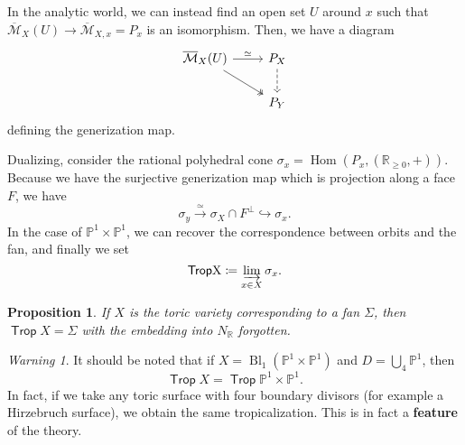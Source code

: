 \documentclass[leqno, openany]{memoir}
\newtheorem{prop}[thm]{Proposition}
\theoremstyle{definition}
\theoremstyle{remark}
\newtheorem{warn}[thm]{Warning}
\theoremstyle{plain}
\theoremstyle{definition}
\theoremstyle{remark}
\newcommand{\R}{\mathbb{R}}
\renewcommand{\P}{\mathbb{P}}
\newcommand{\mc}[1]{\mathcal{#1}}
\newcommand{\ms}[1]{\mathsf{#1}}
\newcommand{\on}[1]{\operatorname{#1}}
\newcommand{\ol}[1]{\overline{#1}}
\DeclareMathOperator{\Bl}{Bl}
\DeclareMathOperator{\Hom}{Hom}
\begin{document}
In the analytic world, we can instead find an open set $U$ around $x$ such that $\ol{\mc{M}}_X(U) \to \ol{\mc{M}}_{X,x} = P_x$ is an isomorphism. Then, we have a diagram
\begin{equation*}
  \begin{tikzcd}
    \ol{\mc{M}}_X(U) \ar{r}{\simeq} \ar[twoheadrightarrow]{dr} & P_X \ar[dashrightarrow]{d} \\
    & P_Y
  \end{tikzcd}
\end{equation*}
defining the generization map.

Dualizing, consider the rational polyhedral cone $\sigma_x = \Hom(P_x, (\R_{\geq 0}, +))$. Because we have the surjective generization map which is projection along a face $F$, we have
\[ \sigma_y \xrightarrow{\simeq} \sigma_X \cap F^{\perp} \hookrightarrow \sigma_x. \]
In the case of $\P^1 \times \P^1$, we can recover the correspondence between orbits and the fan, and finally we set
\[ \on{\ms{Trop} X} \coloneqq \varinjlim_{x \in X} \sigma_x. \]

\begin{prop}
If $X$ is the toric variety corresponding to a fan $\Sigma$, then $\on{\ms{Trop}} X = \Sigma$ with the embedding into $N_{\R}$ forgotten.
\end{prop}

\begin{warn}
  It should be noted that if $X = \Bl_1(\P^1 \times \P^1)$ and $D = \bigcup_4 \P^1$, then
  \[ \on{\ms{Trop}} X = \on{\ms{Trop}} \P^1 \times \P^1. \]
  In fact, if we take any toric surface with four boundary divisors (for example a Hirzebruch surface), we obtain the same tropicalization. This is in fact a \textbf{feature} of the theory.
\end{warn}
\end{document}
